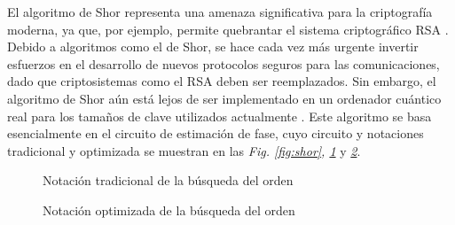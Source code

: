 \documentclass[10pt,conference,a4paper]{IEEEtran}
\begin{document}
El algoritmo de Shor representa una amenaza significativa para la criptografía moderna, ya que, por ejemplo, permite quebrantar el sistema criptográfico RSA \cite{attack_RSA}. Debido a algoritmos como el de Shor, se hace cada vez más urgente invertir esfuerzos en el desarrollo de nuevos protocolos seguros para las comunicaciones, dado que criptosistemas como el RSA deben ser reemplazados. Sin embargo, el algoritmo de Shor aún está lejos de ser implementado en un ordenador cuántico real para los tamaños de clave utilizados actualmente \cite{schnorr} \cite{integer-factoring} \cite{Shor_PD} \cite{Shor_21}. Este algoritmo se basa esencialmente en el circuito de estimación de fase, cuyo circuito y notaciones tradicional y optimizada se muestran en las \textit{Fig. \ref{fig:shor}, \ref{Fig10}} y \textit{\ref{Fig11}}.
\begin{figure}[htb!]
\centering
{}
\caption{Notación tradicional de la búsqueda del orden}
        \label{Fig10} 
\end{figure}
\vspace{-3mm}
\begin{figure}[H]
\centering
{}
\caption{Notación optimizada de la búsqueda del orden}
        \label{Fig11} 
\end{figure}
\end{document}
